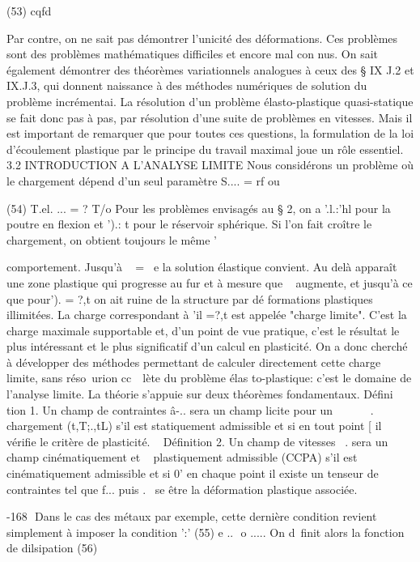 (53) 
cqfd 


Par contre, on ne sait pas démontrer l'unicité des déformations. 
Ces problèmes sont des problèmes mathématiques difficiles et encore mal con­
nus. 
On sait également démontrer des théorèmes variationnels analogues à ceux des § IX J.2 et IX.J.3, qui donnent naissance à des méthodes numéri­ques de solution du problème incrémentai. La résolution d'un problème élas­to-plastique quasi-statique se fait donc pas à pas, par résolution d'une suite de problèmes en vitesses. Mais il est important de remarquer que pour toutes ces questions, la formulation de la loi d'écoulement plastique par le principe du travail maximal joue un rôle essentiel. 
3.2 INTRODUCTION A L'ANALYSE LIMITE 
Nous considérons un problème où le chargement dépend d'un seul paramètre 
S.... = rf ou 

(54)  T.el. ...  =  ? T/o  
Pour les problèmes envisagés  au  §  2,  on  a  '.l.:'hl  pour  la  poutre  en  flexion  
et ').: t  pour le réservoir sphérique.  
Si  l'on fait croître le chargement,  on  obtient  toujours  le même  
' 

comportement. Jusqu'à ~ = ~e la solution élastique convient. Au delà 
apparaît une zone plastique qui progresse au fur et à mesure que ~ aug­mente, et jusqu'à ce que pour'). = ?,t on ait ruine de la structure par dé­
formations plastiques illimitées. 
La charge correspondant à 'il =?,t est appelée "charge limite". C'est la charge maximale supportable et, d'un point de vue pratique, c'est le résultat le plus intéressant et le plus significatif d'un calcul en plas­ticité. On a donc cherché à développer des méthodes permettant de calculer 
directement cette charge limite, sans réso~urion cc~~lète du problème élas­
to-plastique: c'est le domaine de l'analyse limite. 
La théorie s'appuie sur deux théorèmes fondamentaux. 
Défini tion 1. Un champ de contraintes â-.. sera un champ licite pour un 
~~~~~~. ~~ 
chargement (t,T;.,tL) s'il est statiquement admissible et si en tout point 
[ 
il vérifie le critère de plasticité. 
~ 
Définition 2. Un champ de vitesses ~. sera un champ cinématiquement et 
~ 
plastiquement admissible (CCPA) s'il est cinématiquement admissible et si 
0' 
en  chaque point  il existe  un  tenseur  de  contraintes  tel que f... puis­ 
.~  
se  être la déformation plastique associée.  

-168 ­
Dans le cas des métaux par exemple, cette dernière condition re­vient simplement à imposer la condition 
':' 
(55) e ..  o 
..... 
On d~finit alors la fonction de dilsipation 
(56) 

